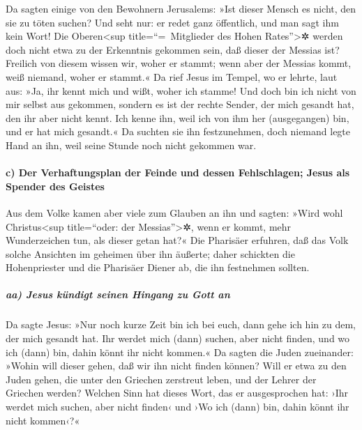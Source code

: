  Da sagten einige von den Bewohnern Jerusalems: »Ist
dieser Mensch es nicht, den sie zu töten suchen?  Und
seht nur: er redet ganz öffentlich, und man sagt ihm kein Wort! Die
Oberen\textless sup title=``=~Mitglieder des Hohen Rates''\textgreater✲
werden doch nicht etwa zu der Erkenntnis gekommen sein, daß dieser der
Messias ist?  Freilich von diesem wissen wir, woher er
stammt; wenn aber der Messias kommt, weiß niemand, woher er stammt.«
 Da rief Jesus im Tempel, wo er lehrte, laut aus: »Ja,
ihr kennt mich und wißt, woher ich stamme! Und doch bin ich nicht von
mir selbst aus gekommen, sondern es ist der rechte Sender, der mich
gesandt hat, den ihr aber nicht kennt.  Ich kenne ihn,
weil ich von ihm her (ausgegangen) bin, und er hat mich gesandt.«
 Da suchten sie ihn festzunehmen, doch niemand legte Hand
an ihn, weil seine Stunde noch nicht gekommen war.

\hypertarget{c-der-verhaftungsplan-der-feinde-und-dessen-fehlschlagen-jesus-als-spender-des-geistes}{%
\paragraph{c) Der Verhaftungsplan der Feinde und dessen Fehlschlagen;
Jesus als Spender des
Geistes}\label{c-der-verhaftungsplan-der-feinde-und-dessen-fehlschlagen-jesus-als-spender-des-geistes}}

 Aus dem Volke kamen aber viele zum Glauben an ihn und
sagten: »Wird wohl Christus\textless sup title=``oder: der
Messias''\textgreater✲, wenn er kommt, mehr Wunderzeichen tun, als
dieser getan hat?«  Die Pharisäer erfuhren, daß das Volk
solche Ansichten im geheimen über ihn äußerte; daher schickten die
Hohenpriester und die Pharisäer Diener ab, die ihn festnehmen sollten.

\hypertarget{aa-jesus-kuxfcndigt-seinen-hingang-zu-gott-an}{%
\subparagraph{aa) Jesus kündigt seinen Hingang zu Gott
an}\label{aa-jesus-kuxfcndigt-seinen-hingang-zu-gott-an}}

 Da sagte Jesus: »Nur noch kurze Zeit bin ich bei euch,
dann gehe ich hin zu dem, der mich gesandt hat.  Ihr
werdet mich (dann) suchen, aber nicht finden, und wo ich (dann) bin,
dahin könnt ihr nicht kommen.«  Da sagten die Juden
zueinander: »Wohin will dieser gehen, daß wir ihn nicht finden können?
Will er etwa zu den Juden gehen, die unter den Griechen zerstreut leben,
und der Lehrer der Griechen werden?  Welchen Sinn hat
dieses Wort, das er ausgesprochen hat: ›Ihr werdet mich suchen, aber
nicht finden‹ und ›Wo ich (dann) bin, dahin könnt ihr nicht kommen‹?«

